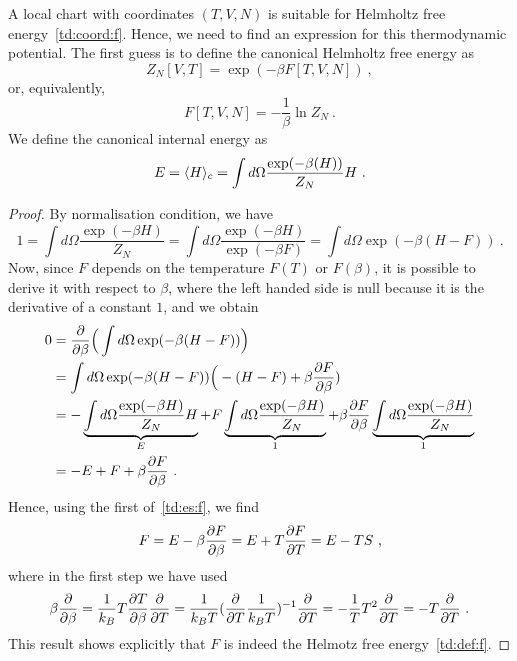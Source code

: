     A local chart with coordinates $(T, V, N)$ is suitable for Helmholtz free energy~\eqref{td:coord:f}. Hence, we need to find an expression for this thermodynamic potential. The first guess is to define the canonical Helmholtz free energy as 
    \begin{equation}\label{c:zf}
        Z_N [V, T] = \exp(-\beta F[T, V, N]) ~,
    \end{equation}
    or, equivalently,
    \begin{equation}\label{c:f}
        F[T, V, N] = -\frac{1}{\beta} \ln Z_N ~.
    \end{equation}
    We define the canonical internal energy as
    \begin{equation}\label{c:e}
        E = \langle H\rangle_{c} = \int d\Omega \frac{\exp(-\beta (H))}{Z_N} H ~.
    \end{equation}
    \begin{proof}
        By normalisation condition, we have
        \begin{equation*}
            1 = \int d\Omega \frac{\exp(-\beta H)}{Z_N} = \int d\Omega \frac{\exp(-\beta H)}{\exp(-\beta F)} = \int d\Omega \exp (- \beta (H - F)) ~.
        \end{equation*}
        Now, since $F$ depends on the temperature $F(T)$ or $F(\beta)$, it is possible to derive it with respect to $\beta$, where the left handed side is null because it is the derivative of a constant $1$, and we obtain
        \begin{equation*}
        \begin{aligned}
            0 & = \frac{\partial}{\partial\beta} \Big ( \int d\Omega \exp (- \beta (H - F)) \Big) \\ & = \int d\Omega \exp (-\beta (H - F)) \Big (-(H - F) + \beta \frac{\partial F}{\partial\beta}) \\ & = - \underbrace{\int d\Omega \frac{\exp(-\beta H)}{Z_N} H}_{E} + F \underbrace{\int d\Omega \frac{\exp(-\beta H)}{Z_N}}_{1} + \beta \frac{\partial F}{\partial\beta} \underbrace{\int d\Omega \frac{\exp(-\beta H)}{Z_N}}_{1} \\ & = - E + F + \beta \frac{\partial F}{\partial\beta} ~.
        \end{aligned}
        \end{equation*}
        Hence, using the first of~\eqref{td:es:f}, we find
        \begin{equation*}
            F = E - \beta \frac{\partial F}{\partial\beta} = E + T \frac{\partial F}{\partial T} = E - TS ~,
        \end{equation*}
        where in the first step we have used 
        \begin{equation*}
            \beta \frac{\partial}{\partial\beta} = \frac{1}{k_B} T \frac{\partial T}{\partial\beta} \frac{\partial}{\partial T} = \frac{1}{k_B T} (\frac{\partial}{\partial T} \frac{1}{k_B T})^{-1} \frac{\partial}{\partial T} = - \frac{1}{T} T^2 \frac{\partial}{\partial T} = - T \frac{\partial}{\partial T} ~.
        \end{equation*}
        This result shows explicitly that $F$ is indeed the Helmotz free energy~\eqref{td:def:f}.
    \end{proof}
